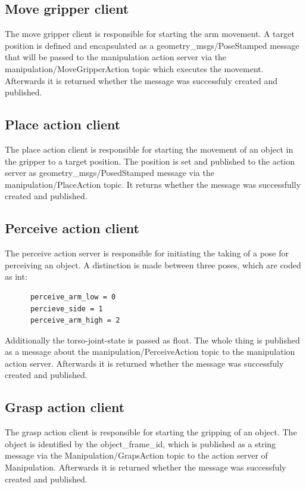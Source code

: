 \documentclass[main.tex]{subfiles}
\begin{document}
		\subsection{Move gripper client}

		The move gripper client is responsible for starting the arm movement. A target position is defined and encapsulated as a geometry\_msgs/PoseStamped message that will be passed to the manipulation action server via the manipulation/MoveGripperAction topic which executes the movement. Afterwards it is returned whether the message was successfuly created and published. 

		\subsection{Place action client}

    The place action client is responsible for starting the movement of an object in the gripper to a target position. The position is set and published to the action server as geometry\_msgs/PosedStamped message via the manipulation/PlaceAction topic. It returns whether the message was successfully created and published.

    \subsection{Perceive action client}

		The perceive action server is responsible for initiating the taking of a pose for perceiving an object. A distinction is made between three poses, which are coded as int: 
		\begin{lstlisting}
      perceive_arm_low = 0
      percieve_side = 1
      perceive_arm_high = 2
		\end{lstlisting}
Additionally the torso-joint-state is passed as float.
The whole thing is published as a message about the manipulation/PerceiveAction topic to the manipulation action server. Afterwards it is returned whether the message was successfuly created and published.

		\subsection{Grasp action client}

		The grasp action client is responsible for starting the gripping of an object. The object is identified by the object\_frame\_id, which is published as a string message via the Manipulation/GrapsAction topic to the action server of Manipulation. Afterwards it is returned whether the message was successfuly created and published.
\end{document}
